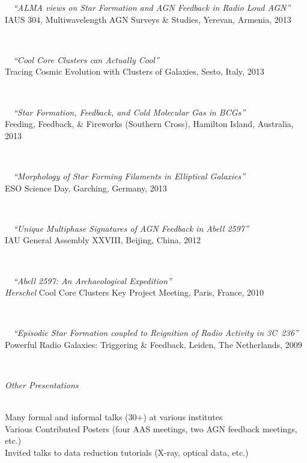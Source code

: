 \documentclass[11pt]{article}
\begin{document}
\hspace{42mm} \parbox{5.15in}{
\textbullet~~\textit{``ALMA views on Star Formation and AGN Feedback in Radio Loud AGN''} \\
IAUS 304, Multiwavelength AGN Surveys \& Studies, Yerevan, Armenia, 2013}\\


\hspace{42mm} \parbox{5.15in}{
\textbullet~~\textit{``Cool Core Clusters can Actually Cool''} \\ Tracing Cosmic Evolution with Clusters of Galaxies, Sesto, Italy, 2013} \\


\hspace{42mm} \parbox{5.15in}{
\textbullet~~\textit{``Star Formation, Feedback, and Cold Molecular Gas in BCGs''} \\ Feeding, Feedback, \& Fireworks (Southern Cross), Hamilton Island, Australia, 2013} \\


\hspace{42mm} \parbox{5.15in}{
\textbullet~~\textit{``Morphology of Star Forming Filaments in Elliptical Galaxies''} \\ ESO Science Day, Garching, Germany, 2013}\\

\hspace{42mm} \parbox{5.15in}{
\textbullet~~\textit{``Unique Multiphase Signatures of AGN Feedback in Abell 2597''} \\ IAU General Assembly XXVIII, Beijing, China, 2012 } \\

\hspace{42mm} \parbox{5.15in}{
\textbullet~~\textit{``Abell 2597: An Archaeological Expedition''} \\ \textit{Herschel} Cool Core Clusters Key Project Meeting, Paris, France, 2010 } \\

\hspace{42mm} \parbox{5.15in}{
\textbullet~~\textit{``Episodic Star Formation coupled to Reignition of Radio Activity in 3C~236''} \\
Powerful Radio Galaxies: Triggering \& Feedback, Leiden, The Netherlands, 2009 } \\


\vspace{4mm}

\hspace{2.5mm} \parbox{1.5in}{\textit{Other Presentations \\\\}} \parbox{5.15in}{
Many formal and informal talks (30+) at various institutes\\
Various Contributed Posters (four AAS meetings, two AGN feedback meetings, etc.)\\
Invited talks to data reduction tutorials (X-ray, optical data, etc.)
}\\
\end{document}
